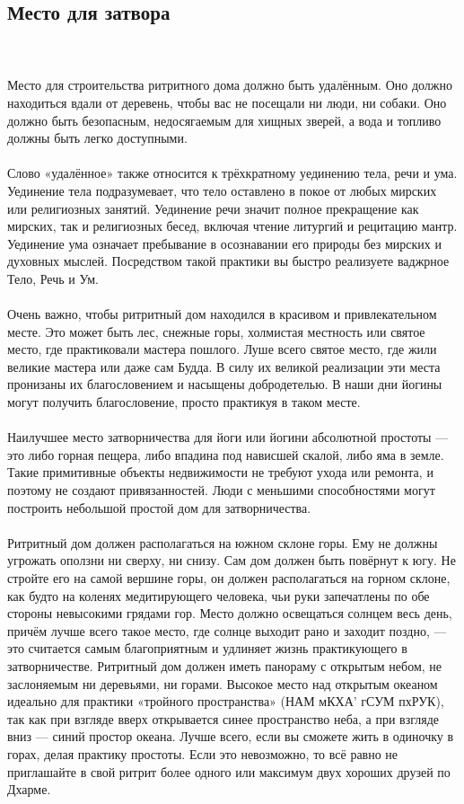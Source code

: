 \subsection{Место для затвора}
\\ \\ Место для строительства ритритного дома должно быть удалённым. Оно должно находиться вдали от деревень, чтобы вас не посещали ни люди, ни собаки. Оно должно быть безопасным, недосягаемым для хищных зверей, а вода и топливо должны быть легко доступными.
\\ \\ Слово «удалённое» также относится к трёхкратному уединению тела, речи и ума. Уединение тела подразумевает, что тело оставлено в покое от любых мирских или религиозных занятий. Уединение речи значит полное прекращение как мирских, так и религиозных бесед, включая чтение литургий и рецитацию мантр. Уединение ума означает пребывание в осознавании его природы без мирских и духовных мыслей. Посредством такой практики вы быстро реализуете ваджрное Тело, Речь и Ум.
\\ \\ Очень важно, чтобы ритритный дом находился в красивом и привлекательном месте. Это может быть лес, снежные горы, холмистая местность или святое место, где практиковали мастера пошлого. Луше всего святое место, где жили великие мастера или даже сам Будда. В силу их великой реализации эти места пронизаны их благословением и насыщены добродетелью. В наши дни йогины могут получить благословение, просто практикуя в таком месте.
\\ \\ Наилучшее место затворничества для йоги или йогини абсолютной простоты — это либо горная пещера, либо впадина под нависшей скалой, либо яма в земле. Такие примитивные объекты недвижимости не требуют ухода или ремонта, и поэтому не создают привязанностей. Люди с меньшими способностями могут построить небольшой простой дом для затворничества.
\\ \\ Ритритный дом должен располагаться на южном склоне горы. Ему не должны угрожать оползни ни сверху, ни снизу. Сам дом должен быть повёрнут к югу. Не стройте его на самой вершине горы, он должен располагаться на горном склоне, как будто на коленях медитирующего человека, чьи руки запечатлены по обе стороны невысокими грядами гор. Место должно освещаться солнцем весь день, причём лучше всего такое место, где солнце выходит рано и заходит поздно, — это считается самым благоприятным и удлиняет жизнь практикующего в затворничестве. Ритритный дом должен иметь панораму с открытым небом, не заслоняемым ни деревьями, ни горами. Высокое место над открытым океаном идеально для практики «тройного пространства» (НАМ мКХА' гСУМ пхРУК), так как при взгляде вверх открывается синее пространство неба, а при взгляде вниз — синий простор океана. Лучше всего, если вы сможете жить в одиночку в горах, делая практику простоты. Если это невозможно, то всё равно не приглашайте в свой ритрит более одного или максимум двух хороших друзей по Дхарме.
